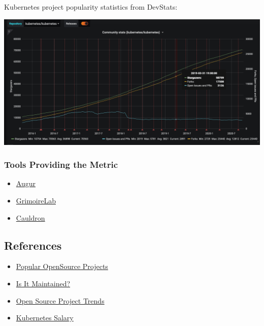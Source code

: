 Kubernetes project popularity statistics from DevStats:

\includegraphics{images/project-popularity_kubernetes.png}

\hypertarget{tools-providing-the-metric}{%
\subsubsection{Tools Providing the
Metric}\label{tools-providing-the-metric}}

\begin{itemize}
\tightlist
\item
  \href{https://github.com/chaoss/augur}{Augur}
\item
  \href{https://chaoss.github.io/grimoirelab/}{GrimoireLab}
\item
  \href{https://cauldron.io/}{Cauldron}
\end{itemize}

\hypertarget{references}{%
\subsection{References}\label{references}}

\begin{itemize}
\tightlist
\item
  \href{http://blog.honeypot.io/most-exciting-open-source-projects-2018/}{Popular
  OpenSource Projects}
\item
  \href{https://isitmaintained.com/}{Is It Maintained?}
\item
  \href{https://github.blog/2018-02-08-open-source-project-trends-for-2018/}{Open
  Source Project Trends}
\item
  \href{https://www.payscale.com/research/US/Skill=Kubernetes/Salary}{Kubernetes
  Salary}
\end{itemize}
